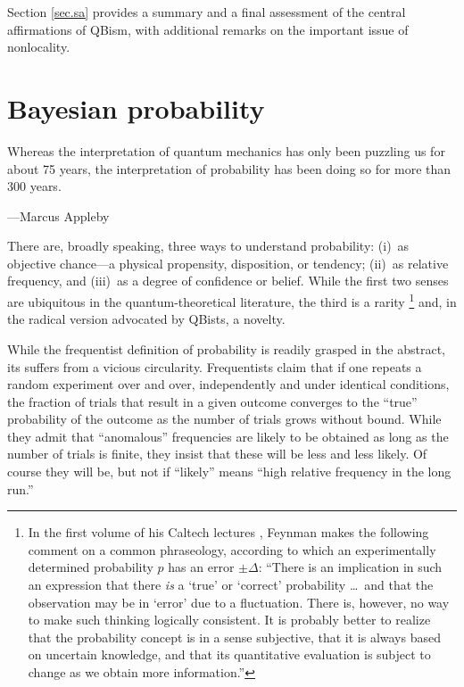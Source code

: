 \documentclass[12pt]{article}
\begin{document}
Section \ref{sec.sa} provides a summary and a final assessment of the central affirmations of QBism, with additional remarks on the important issue of nonlocality.


\section{Bayesian probability}\label{sec.bp}
{\leftskip\parindent\small Whereas the interpretation of quantum mechanics has only been puzzling us for about 75 years, the interpretation of probability has been doing so for more than 300 years.\par\hfill---Marcus Appleby \cite{Appleby2005}\par}\medskip

\noindent There are, broadly speaking, three ways to understand probability:  (i)~as objective {chance}---a physical {propensity}, {disposition}, or {tendency}; (ii)~as {relative frequency}, and (iii)~as a degree of confidence or belief. While the first two senses are ubiquitous in the quantum-theoretical literature, the third is a rarity%
\footnote{In the first volume of his Caltech lectures \cite{FLS1}, Feynman makes the following comment on a common phraseology, according to which an experimentally determined probability $p$ has an error $\pm\Delta$: ``There is an implication in such an expression that there \emph{is} a `true' or `correct' probability \dots\ and that the observation may be in `error' due to a fluctuation.  There is, however, no way to make such thinking logically consistent.  It is probably better to realize that the probability concept is in a sense subjective, that it is always based on uncertain knowledge, and that its quantitative evaluation is subject to change as we obtain more information.''}
and, in the radical version advocated by QBists, a novelty.

While the frequentist definition of probability is readily grasped in the abstract, its suffers from a vicious circularity. Frequentists claim that if one repeats a random experiment over and over, independently and under identical conditions, the fraction of trials that result in a given outcome converges to the ``true'' probability of the outcome as the number of trials grows without bound. While they admit that ``anomalous'' frequencies are likely to be obtained as long as the number of trials is finite, they insist that these will be less and less likely. Of course they will be, but not if ``likely'' means ``high relative frequency in the long run.''
\end{document}
